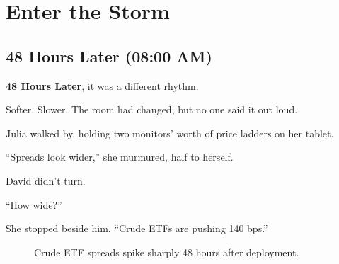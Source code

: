 \section{Enter the Storm}

\subsection{48 Hours Later (08:00 AM)}

\textbf{48 Hours Later}, it was a different rhythm.

Softer. Slower.
The room had changed, but no one said it out loud.

Julia walked by, holding two monitors’ worth of price ladders on her tablet.

“Spreads look wider,” she murmured, half to herself.

David didn’t turn.

“How wide?”

She stopped beside him. “Crude ETFs are pushing 140 bps.”

\medskip

\begin{figure}[H]
  \centering
  \caption{Crude ETF spreads spike sharply 48 hours after deployment.}
\end{figure}

\medskip

